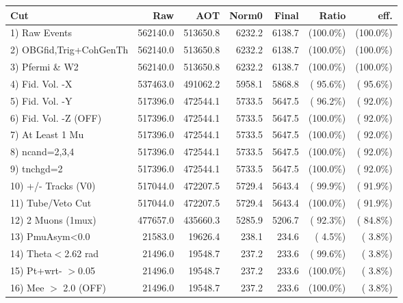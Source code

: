  \begin{table}[h!]\centering
 \begin{tabular}{||l||r|r|r|r|r|r||}
 \hline
 \hline
 Cut & Raw & AOT & Norm0 & Final & Ratio & eff.       \\
 \hline
  1) Raw Events           &     562140.0 &     513650.8 &       6232.2 &       6138.7 & (100.0\%) & (100.0\%) \\
  2) OBGfid,Trig+CohGenTh &     562140.0 &     513650.8 &       6232.2 &       6138.7 & (100.0\%) & (100.0\%) \\
  3) Pfermi \& W2         &     562140.0 &     513650.8 &       6232.2 &       6138.7 & (100.0\%) & (100.0\%) \\
  4) Fid. Vol. -X         &     537463.0 &     491062.2 &       5958.1 &       5868.8 & ( 95.6\%) & ( 95.6\%) \\
  5) Fid. Vol. -Y         &     517396.0 &     472544.1 &       5733.5 &       5647.5 & ( 96.2\%) & ( 92.0\%) \\
  6) Fid. Vol. -Z (OFF)   &     517396.0 &     472544.1 &       5733.5 &       5647.5 & (100.0\%) & ( 92.0\%) \\
  7) At Least 1 Mu        &     517396.0 &     472544.1 &       5733.5 &       5647.5 & (100.0\%) & ( 92.0\%) \\
  8) ncand=2,3,4          &     517396.0 &     472544.1 &       5733.5 &       5647.5 & (100.0\%) & ( 92.0\%) \\
  9) tnchgd=2             &     517396.0 &     472544.1 &       5733.5 &       5647.5 & (100.0\%) & ( 92.0\%) \\
 10) +/- Tracks (V0)      &     517044.0 &     472207.5 &       5729.4 &       5643.4 & ( 99.9\%) & ( 91.9\%) \\
 11) Tube/Veto Cut        &     517044.0 &     472207.5 &       5729.4 &       5643.4 & (100.0\%) & ( 91.9\%) \\
 12) 2 Muons (1mux)       &     477657.0 &     435660.3 &       5285.9 &       5206.7 & ( 92.3\%) & ( 84.8\%) \\
 13) PmuAsym<0.0          &      21583.0 &      19626.4 &        238.1 &        234.6 & (  4.5\%) & (  3.8\%) \\
 14) Theta$<$2.62 rad     &      21496.0 &      19548.7 &        237.2 &        233.6 & ( 99.6\%) & (  3.8\%) \\
 15) Pt+wrt- $>$0.05      &      21496.0 &      19548.7 &        237.2 &        233.6 & (100.0\%) & (  3.8\%) \\
 16) Mee $>$ 2.0  (OFF)   &      21496.0 &      19548.7 &        237.2 &        233.6 & (100.0\%) & (  3.8\%) \\

\end{tabular}
\end{table}

